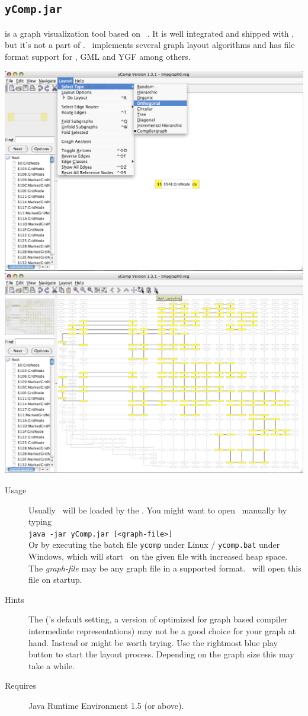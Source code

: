 \subsection{\texttt{yComp.jar}}
\label{tools:ycomp}
\yComp{} \cite{ycomp} is a graph visualization tool based on \yFiles\ \cite{yfiles}.
It is well integrated and shipped with \GrG, but it's not a part of \GrG.
\yComp\ implements several graph layout algorithms and has file format support for , GML and YGF among others.
\begin{center}
\includegraphics[width=0.49\linewidth]{fig/ycomp1.pdf} \includegraphics[width=0.49\linewidth]{fig/ycomp2.pdf}
\end{center}
\begin{description}
  \item[Usage] Usually \yComp\ will be loaded by the \GrShell. You might want to open \yComp\ manually by typing\\
   \texttt{java -jar yComp.jar [<graph-file>]}\\
  Or by executing the batch file \texttt{ycomp} under Linux / \texttt{ycomp.bat} under Windows,
  which will start \yComp\ on the given file with increased heap space.
  The \emph{graph-file} may be any graph file in a supported format. \yComp\ will open this file on startup.
  \item[Hints] The   (\yComp's default setting, a version of \texttt{} optimized for graph based compiler intermediate representations) may not be a good choice for your graph at hand.
  Instead \texttt{} or \texttt{} might be worth trying.
  Use the rightmost blue play button to start the layout process. Depending on the graph size this may take a while.
  \item[Requires] Java Runtime Environment 1.5 (or above).
\end{description}


